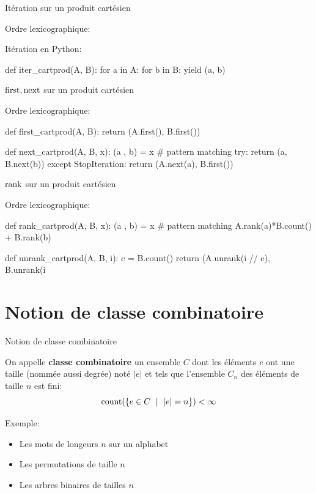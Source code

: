 \documentclass{beamer}
\begin{document}
\begin{frame}[fragile]{Itération sur un produit cartésien}

  Ordre lexicographique:
  \bigskip

  Itération en Python:
\begin{listing}{1}
    def iter_cartprod(A, B):
        for a in A:
            for b in B:
                yield (a, b)
\end{listing}
\end{frame}

\begin{frame}[fragile]{$\operatorname{first}, \operatorname{next}$ sur un produit cartésien}

  Ordre lexicographique:
  \bigskip
\begin{listing}{1}
    def first_cartprod(A, B):
        return (A.first(), B.first())

    def next_cartprod(A, B, x):
        (a , b) = x      # pattern matching
        try:
           return (a, B.next(b))
        except StopIteration:
           return (A.next(a), B.first())
\end{listing}
\end{frame}


\begin{frame}[fragile]{$\operatorname{rank}$ sur un produit cartésien}

  Ordre lexicographique:
  \bigskip
\begin{listing}{1}
    def rank_cartprod(A, B, x):
        (a , b) = x      # pattern matching
        A.rank(a)*B.count() + B.rank(b)

    def unrank_cartprod(A, B, i):
        c = B.count()
        return (A.unrank(i // c), B.unrank(i %
\end{listing}
\end{frame}


\section{Notion de classe combinatoire}

\begin{frame}{Notion de classe combinatoire}
  \begin{DEFN}
    On appelle \textbf{classe combinatoire} un ensemble $C$ dont les éléments
    $e$ ont une taille (nommée aussi degrée) noté $|e|$ et tels que l'ensemble
    $C_n$ des éléments de taille $n$ est fini:
    \[
    \operatorname{count}(\{e\in C\ \mid\ |e| = n\}) < \infty
    \]
  \end{DEFN}
  Exemple:
  \begin{itemize}
  \item Les mots de longeurs $n$ sur un alphabet
  \item Les permutations de taille $n$
  \item Les arbres binaires de tailles $n$
  \end{itemize}
\end{frame}
\end{document}
